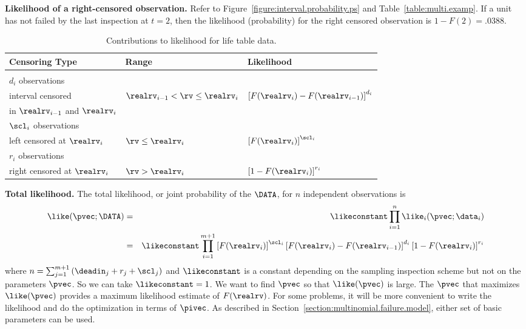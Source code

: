 \begin{example}{\bf Likelihood of a right-censored observation.}
Refer to Figure~\ref{figure:interval.probability.ps} and
Table~\ref{table:multi.examp}. If a unit has not failed by the last
inspection at $t=2$, then the likelihood (probability) for the right
censored observation is $1-F(2) = .0388$.
\end{example}


\begin{table}
\caption{Contributions to likelihood for life table data.}
\centering\small
\begin{tabular}{lll}
\\[-.5ex]
Censoring Type &Range
& Likelihood \\ \hline \\
$d_{i}$ observations\\
interval censored & $\realrv_{i-1} < \rv \le
\realrv_{i}$& 
$\left [F(\realrv_{i})-F(\realrv_{i-1})  \right ]^{d_{i}}$\\
in $\realrv_{i-1}$ and $\realrv_{i}$ \\[2ex]
$\scl_{i}$ observations\\
left censored at $\realrv_{i}$ & $\rv \le
\realrv_{i}$&$ \left [F(\realrv_{i})\right ]^{\scl_{i}}$ 
\\[2ex]
$r_{i}$ observations\\
right censored at $\realrv_{i}$ & $\rv > \realrv_{i}$&
$\left [1-F(\realrv_{i}) \right ]^{r_{i}}$
\\[1ex]
\hline
\end{tabular}
\label{table:censoring.types}
\end{table}

\noindent
{\bf Total likelihood.}
The total likelihood, or joint probability of
the $\DATA$, for
$n$ independent observations is
\begin{eqnarray}
\label{equation:likelihood.over.intervals}
\like(\pvec;\DATA)&=&\likeconstant
\prod_{i=1}^{n} \like_{i}(\pvec;\data_{i})
\\ \nonumber
&=& \likeconstant
\prod_{i=1}^{m+1}
 \left [F(\realrv_{i}) \right]^{\scl_{i}}
 \left [F(\realrv_{i})-F(\realrv_{i-1}) \right ]^{d_{i}}
 \left [1-F(\realrv_{i}) \right ]^{r_{i}}
\end{eqnarray}
where $n=\sum_{j=1}^{m+1} \left (\deadin_{j}+r_{j}+\scl_{j} \right )$
and $\likeconstant$ is a constant depending on the sampling inspection
scheme but not on the parameters $\pvec$.  So we can take
$\likeconstant=1$.  We want to find $\pvec$ so that $\like(\pvec)$ is
large.  The $\pvec$ that maximizes $\like(\pvec)$ provides a maximum
likelihood estimate of $F(\realrv)$.  For some problems, it will be
more convenient to write the likelihood and do the optimization in
terms of $\pivec$. As described in
Section~\ref{section:multinomial.failure.model}, either set of basic
parameters can be used.

